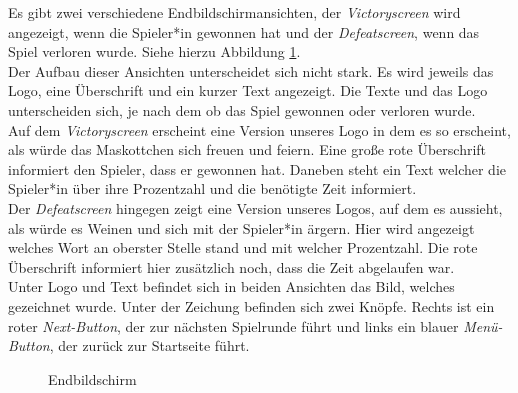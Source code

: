 \documentclass[11pt]{article}
\begin{document}
Es gibt zwei verschiedene Endbildschirmansichten, der \textit{Victoryscreen} wird angezeigt, wenn die Spieler*in gewonnen hat und der \textit{Defeatscreen}, wenn das Spiel verloren wurde. Siehe hierzu Abbildung \ref{fig:endscreen}.\\
Der Aufbau dieser Ansichten unterscheidet sich nicht stark. Es wird jeweils das Logo, eine Überschrift und ein kurzer Text angezeigt. Die Texte und das Logo unterscheiden sich, je nach dem ob das Spiel gewonnen oder verloren wurde. \\
Auf dem \textit{Victoryscreen} erscheint eine Version unseres Logo in dem es so erscheint, als würde das Maskottchen sich freuen und feiern. Eine große rote Überschrift informiert den Spieler, dass er gewonnen hat. Daneben steht ein Text welcher die Spieler*in über ihre Prozentzahl und die benötigte Zeit informiert.\\
Der \textit{Defeatscreen} hingegen zeigt eine Version unseres Logos, auf dem es aussieht, als würde es Weinen und sich mit der Spieler*in ärgern. Hier wird angezeigt welches Wort an oberster Stelle stand und mit welcher Prozentzahl. Die rote Überschrift informiert hier zusätzlich noch, dass die Zeit abgelaufen war.\\
Unter Logo und Text befindet sich in beiden Ansichten das Bild, welches gezeichnet wurde. Unter der Zeichung befinden sich zwei Knöpfe. Rechts ist ein roter \textit{Next-Button}, der zur nächsten Spielrunde führt und links ein blauer \textit{Menü-Button}, der zurück zur Startseite führt.

\begin{figure}[ht]
\centering
\caption{\label{fig:endscreen} Endbildschirm}
\end{figure}
\end{document}
